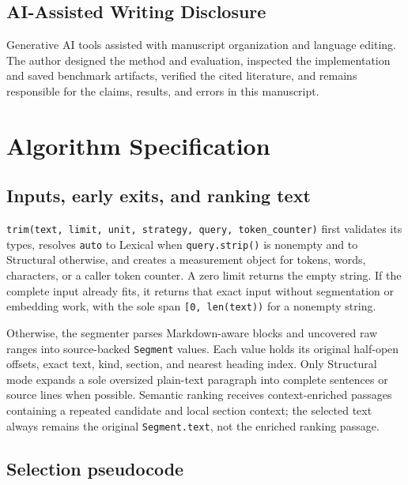 \documentclass[
]{article}
\newcounter{none} %
\begin{document}
\subsection{AI-Assisted Writing
Disclosure}\label{ai-assisted-writing-disclosure}

Generative AI tools assisted with manuscript organization and language
editing. The author designed the method and evaluation, inspected the
implementation and saved benchmark artifacts, verified the cited
literature, and remains responsible for the claims, results, and errors
in this manuscript.

\appendix

\section{Algorithm Specification}\label{algorithm-specification}

\subsection{Inputs, early exits, and ranking
text}\label{inputs-early-exits-and-ranking-text}

\texttt{trim(text,\ limit,\ unit,\ strategy,\ query,\ token\_counter)}
first validates its types, resolves \texttt{auto} to Lexical when
\texttt{query.strip()} is nonempty and to Structural otherwise, and
creates a measurement object for tokens, words, characters, or a caller
token counter. A zero limit returns the empty string. If the complete
input already fits, it returns that exact input without segmentation or
embedding work, with the sole span \texttt{{[}0,\ len(text))} for a
nonempty string.

Otherwise, the segmenter parses Markdown-aware blocks and uncovered raw
ranges into source-backed \texttt{Segment} values. Each value holds its
original half-open offsets, exact text, kind, section, and nearest
heading index. Only Structural mode expands a sole oversized plain-text
paragraph into complete sentences or source lines when possible.
Semantic ranking receives context-enriched passages containing a
repeated candidate and local section context; the selected text always
remains the original \texttt{Segment.text}, not the enriched ranking
passage.

\subsection{Selection pseudocode}\label{selection-pseudocode}
\end{document}
